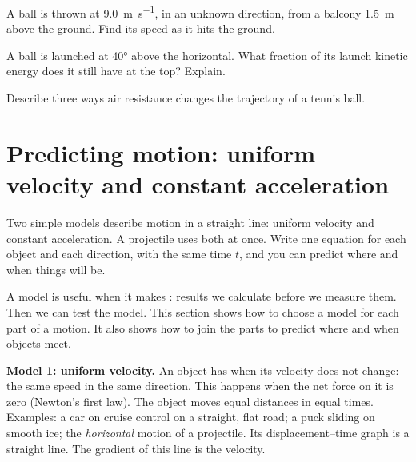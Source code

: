 \begin{quickcheck}
  \item A ball is thrown at \qty{9.0}{m.s^{-1}}, in an unknown direction, from a balcony
        \qty{1.5}{m} above the ground. Find its speed as it hits the ground.
  \item A ball is launched at \ang{40} above the horizontal. What fraction of its launch
        kinetic energy does it still have at the top? Explain.
  \item Describe three ways air resistance changes the trajectory of a tennis ball.
\end{quickcheck}

\section{Predicting motion: uniform velocity and constant acceleration}\label{ch1:sec:predict}

\begin{bigidea}
Two simple models describe motion in a straight line: uniform velocity and constant
acceleration. A projectile uses both at once. Write one equation for each object and each
direction, with the same time $t$, and you can predict where and when things will be.
\end{bigidea}

\begin{keywords}
\end{keywords}

A model is useful when it makes : results we calculate before we measure
them. Then we can test the model. This section shows how to choose a model for each part of a
motion. It also shows how to join the parts to predict where and when objects meet.

\textbf{Model 1: uniform velocity.} An object has  when its velocity
does not change: the same speed in the same direction. This happens when the net force on it is
zero (Newton's first law). The object moves equal distances in equal times. Examples: a car on
cruise control on a straight, flat road; a puck sliding on smooth ice; the \emph{horizontal}
motion of a projectile. Its displacement--time graph is a straight line. The gradient of this
line is the velocity.

